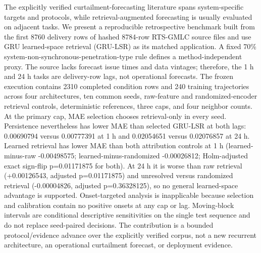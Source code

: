 The explicitly verified curtailment-forecasting literature spans system-specific targets and protocols, while retrieval-augmented forecasting is usually evaluated on adjacent tasks. We present a reproducible retrospective benchmark built from the first 8760 delivery rows of hashed 8784-row RTS-GMLC source files and use GRU learned-space retrieval (GRU-LSR) as its matched application. A fixed 70\% system-non-synchronous-penetration-type rule defines a method-independent proxy. The source lacks forecast issue times and data vintages; therefore, the 1 h and 24 h tasks are delivery-row lags, not operational forecasts. The frozen execution contains 2310 completed condition rows and 240 training trajectories across four architectures, ten common seeds, raw-feature and randomized-encoder retrieval controls, deterministic references, three caps, and four neighbor counts. At the primary cap, MAE selection chooses retrieval-only in every seed. Persistence nevertheless has lower MAE than selected GRU-LSR at both lags: 0.00690794 versus 0.00777391 at 1 h and 0.02054651 versus 0.02076857 at 24 h. Learned retrieval has lower MAE than both attribution controls at 1 h (learned-minus-raw -0.00498575; learned-minus-randomized -0.00026812; Holm-adjusted exact sign-flip p=0.01171875 for both). At 24 h it is worse than raw retrieval (+0.00126543, adjusted p=0.01171875) and unresolved versus randomized retrieval (-0.00004826, adjusted p=0.36328125), so no general learned-space advantage is supported. Onset-targeted analysis is inapplicable because selection and calibration contain no positive onsets at any cap or lag. Moving-block intervals are conditional descriptive sensitivities on the single test sequence and do not replace seed-paired decisions. The contribution is a bounded protocol/evidence advance over the explicitly verified corpus, not a new recurrent architecture, an operational curtailment forecast, or deployment evidence.
